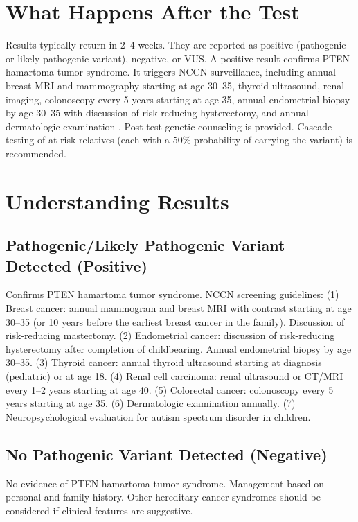 \section*{What Happens After the Test}
Results typically return in 2--4 weeks. They are reported as positive (pathogenic or likely pathogenic variant), negative, or VUS. A positive result confirms PTEN hamartoma tumor syndrome. It triggers NCCN surveillance, including annual breast MRI and mammography starting at age 30--35, thyroid ultrasound, renal imaging, colonoscopy every 5 years starting at age 35, annual endometrial biopsy by age 30--35 with discussion of risk-reducing hysterectomy, and annual dermatologic examination \cite{nccn2024genetic}. Post-test genetic counseling is provided. Cascade testing of at-risk relatives (each with a 50\% probability of carrying the variant) is recommended.

\section*{Understanding Results}

\subsection*{Pathogenic/Likely Pathogenic Variant Detected (Positive)}
Confirms PTEN hamartoma tumor syndrome. NCCN screening guidelines: (1) Breast cancer: annual mammogram and breast MRI with contrast starting at age 30--35 (or 10 years before the earliest breast cancer in the family). Discussion of risk-reducing mastectomy. (2) Endometrial cancer: discussion of risk-reducing hysterectomy after completion of childbearing. Annual endometrial biopsy by age 30--35. (3) Thyroid cancer: annual thyroid ultrasound starting at diagnosis (pediatric) or at age 18. (4) Renal cell carcinoma: renal ultrasound or CT/MRI every 1--2 years starting at age 40. (5) Colorectal cancer: colonoscopy every 5 years starting at age 35. (6) Dermatologic examination annually. (7) Neuropsychological evaluation for autism spectrum disorder in children.

\subsection*{No Pathogenic Variant Detected (Negative)}
No evidence of PTEN hamartoma tumor syndrome. Management based on personal and family history. Other hereditary cancer syndromes should be considered if clinical features are suggestive.

